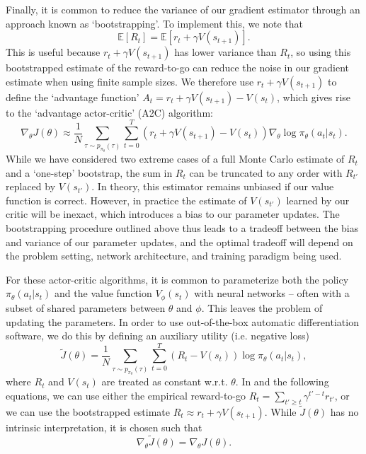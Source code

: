 Finally, it is common to reduce the variance of our gradient estimator through an approach known as `bootstrapping'.
To implement this, we note that
\begin{equation}
    \mathbb{E} \left [ R_t \right ] = \mathbb{E}[r_t + \gamma V(s_{t+1})].
\end{equation}
This is useful because $r_t + \gamma V(s_{t+1})$ has lower variance than $R_t$, so using this bootstrapped estimate of the reward-to-go can reduce the noise in our gradient estimate when using finite sample sizes.
We therefore use $r_t + \gamma V(s_{t+1})$ to define the `advantage function' $A_t = r_t + \gamma V(s_{t+1}) - V(s_t)$, which gives rise to the `advantage actor-critic' (A2C) algorithm:
\begin{equation}
    \nabla_\theta J(\theta) \approx \frac{1}{N} \sum_{\tau \sim p_{\pi_\theta}(\tau)}  \sum_{t=0}^T (r_t + \gamma V(s_{t+1}) - V(s_t)) \nabla_\theta \log \pi_\theta (a_t|s_t).
\end{equation}
While we have considered two extreme cases of a full Monte Carlo estimate of $R_t$ and a `one-step' bootstrap, the sum in $R_t$ can be truncated to any order with $R_{t'}$ replaced by $V(s_{t'})$.
In theory, this estimator remains unbiased if our value function is correct.
However, in practice the estimate of $V(s_{t'})$ learned by our critic will be inexact, which introduces a bias to our parameter updates.
The bootstrapping procedure outlined above thus leads to a tradeoff between the bias and variance of our parameter updates, and the optimal tradeoff will depend on the problem setting, network architecture, and training paradigm being used.

For these actor-critic algorithms, it is common to parameterize both the policy $\pi_\theta(a_t|s_t)$ and the value function $V_\phi(s_t)$ with neural networks -- often with a subset of shared parameters between $\theta$ and $\phi$.
This leaves the problem of updating the parameters.
In order to use out-of-the-box automatic differentiation software, we do this by defining an auxiliary utility (i.e. negative loss)
\begin{equation}
    \label{eq:Jtilde}
    \tilde{J}(\theta) = \frac{1}{N} \sum_{\tau \sim p_{\pi_\theta}(\tau)}  \sum_{t=0}^T (R_t - V(s_t)) \log \pi_\theta (a_t|s_t),
\end{equation}
where $R_t$ and $V(s_t)$ are treated as constant w.r.t. $\theta$.
In  and the following equations, we can use either the empirical reward-to-go $R_t = \sum_{t' \geq t} \gamma^{t'-t} r_{t'}$, or we can use the bootstrapped estimate $R_t \approx r_t + \gamma V(s_{t+1})$.
While $\tilde{J}(\theta)$ has no intrinsic interpretation, it is chosen such that
\begin{equation}
    \nabla_\theta \tilde{J}(\theta) = \nabla_\theta J(\theta).
\end{equation}

